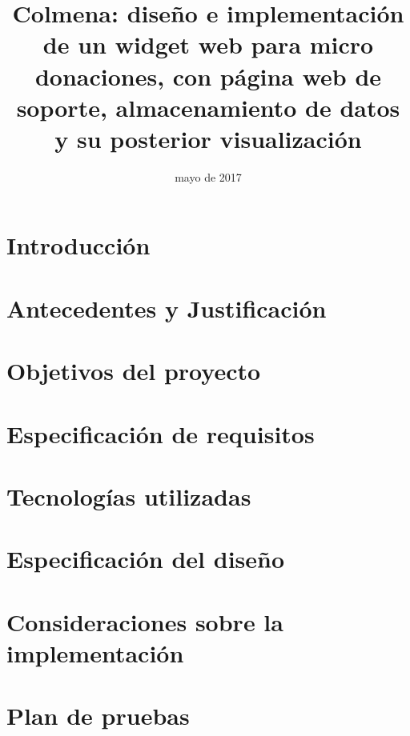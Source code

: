 \documentclass{memoriaPFC}
\title{Colmena: diseño e implementación de un widget web para micro donaciones, con página web de soporte, almacenamiento de datos y su posterior visualización}
\date{mayo de 2017}
\begin{document}
\frontmatter
\hacerportada
\hacerresumen
\tableofcontents
\listoffigures %
\listoftables %
\lstlistoflistings %

\mainmatter
\chapter{Introducción}



\chapter{Antecedentes y Justificación}



\chapter{Objetivos del proyecto}



\chapter{Especificación de requisitos}



\chapter{Tecnologías utilizadas}



\chapter{Especificación del diseño}



\chapter{Consideraciones sobre la implementación}



\chapter{Plan de pruebas}
\end{document}
